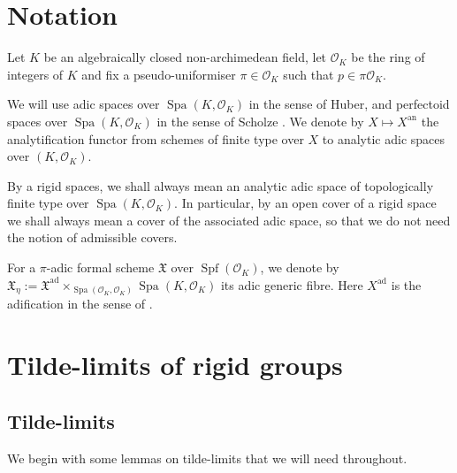 \documentclass[10pt,oneside]{amsart}
\theoremstyle{definition}
\newcommand{\an}{\mathrm{an}}
\renewcommand{\O}{\mathcal{O}}
\begin{document}
\section*{Notation}
	Let $K$ be an algebraically closed non-archimedean field, let $\mathcal O_K$ be the ring of integers of $K$ and fix a pseudo-uniformiser $\pi\in \mathcal O_K$ such that $p\in\pi\mathcal O_K$. 
	
	We will use adic spaces over $\operatorname{Spa}(K,\O_K)$ in the sense of Huber, and perfectoid spaces over $\operatorname{Spa}(K,\O_K)$ in the sense of Scholze \cite{perfectoid}. We denote by $X\mapsto X^{\an}$ the analytification functor from schemes of finite type over $X$ to analytic adic spaces over $(K,\O_K)$.
	
	By a rigid spaces, we shall always mean an analytic adic space of topologically finite type over $\operatorname{Spa}(K,\mathcal O_K)$. 
	In particular, by an open cover of a rigid space we shall always mean a cover of the associated adic space, so that we do not need the notion of admissible covers.
	
	For a $\pi$-adic formal scheme $\mathfrak X$ over $\operatorname{Spf}(\mathcal O_K)$, we denote by $\mathfrak X_\eta:=\mathfrak X^{\mathrm{ad}}\times_{\operatorname{Spa}(\mathcal O_K,\mathcal O_K)}\operatorname{Spa}(K,\mathcal O_K)$ its adic generic fibre. Here $X^{\mathrm{ad}}$ is the adification in the sense of \cite{SW}.


	
	\section{Tilde-limits of rigid groups} \label{section:tilde_limit}
  
	

		\subsection{Tilde-limits} 
	We begin with some lemmas on tilde-limits that we will need throughout.
		
\end{document}
